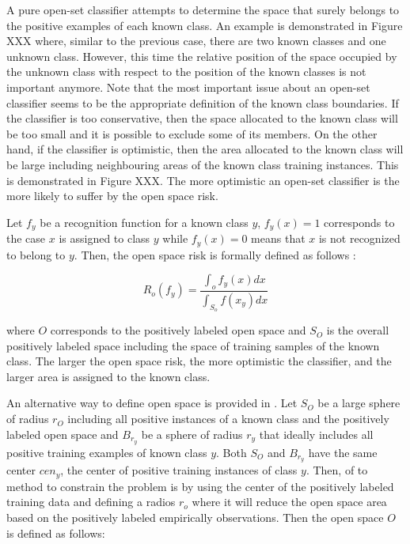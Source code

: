 A pure open-set classifier attempts to determine the space that surely belongs to the positive examples of each known class. An example is demonstrated in Figure XXX where, similar to the previous case, there are two known classes and one unknown class. However, this time the relative position of the space occupied by the unknown class with respect to the position of the known classes is not important anymore. Note that the most important issue about an open-set classifier seems to be the appropriate definition of the known class boundaries. If the classifier is too conservative, then the space allocated to the known class will be too small and it is possible to exclude some of its members. On the other hand, if the classifier is optimistic, then the area allocated to the known class will be large including neighbouring areas of the known class training instances. This is demonstrated in Figure XXX. The more optimistic an open-set classifier is the more likely to suffer by the open space risk.

Let $f_y$ be a recognition function for a known class $y$, $f_y(x)=1$ corresponds to the case $x$ is assigned to class $y$ while $f_y(x)=0$ means that $x$ is not recognized to belong to $y$. Then, the open space risk is formally defined as follows \parencite{scheirer2013toward}:

\begin{equation}\label{chap:eval_methods:eq:the_original_open_space_risk}
	R_{o}(f_y) = \frac{\int_{o} f_y(x) dx}{\int_{S_{o}}  f(x_y) dx}
\end{equation}

\noindent
where $O$ corresponds to the positively labeled open space and $S_O$ is the overall positively labeled space including the space of training samples of the known class. The larger the open space risk, the more optimistic the classifier, and the larger area is assigned to the known class.  

An alternative way to define open space is provided in  \parencite{fei2016breaking}. Let $S_O$ be a large sphere of radius $r_O$ including all positive instances of a known class and the positively labeled open space and $B_{r_y}$ be a sphere of radius $r_y$ that ideally includes all positive training examples of known class $y$. Both $S_O$ and $B_{r_y}$ have the same center $cen_y$, the center of positive training instances of class $y$. Then, of to method to constrain the problem is by using the center of the positively labeled training data and defining a radios $r_{o}$ where it will reduce the open space area based on the positively labeled empirically observations. Then the open space $O$ is defined as follows:

